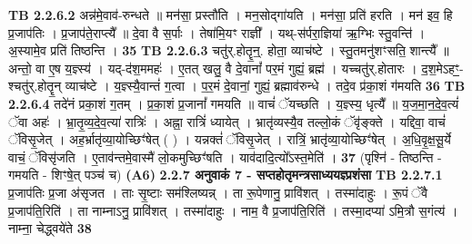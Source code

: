 \documentclass[17pt]{extarticle}
\begin{document}
                  \newline
                                \textbf{ TB 2.2.6.2} \newline
                  अन्न॑मे॒वाव॑-रुन्धते ॥ मन॑सा॒ प्रस्तौ॑ति । मन॒सोद्गा॑यति । मन॑सा॒ प्रति॑ हरति । मन॑ इव॒ हि प्र॒जाप॑तिः । प्र॒जाप॑ते॒राप्त्यै᳚ ॥ दे॒वा वै स॒र्पाः । तेषा॑मि॒यꣳ राज्ञी᳚ । यथ्-स॑र्परा॒ज्ञिया॑ ऋ॒ग्भिः स्तु॒वन्ति॑ । अ॒स्यामे॒व प्रति॑ तिष्ठन्ति । \textbf{ 35} \newline
                  \newline
                                \textbf{ TB 2.2.6.3} \newline
                  चतु॑र्.होतॄ॒न्॒. होता॒ व्याच॑ष्टे । स्तु॒तमनु॑शꣳसति॒ शान्त्यै᳚ ॥ अन्तो॒ वा ए॒ष य॒ज्ञ्स्य॑ । यद्-द॑श॒ममहः॑ । ए॒तत् खलु॒ वै दे॒वानां᳚ पर॒मं गुह्यं॒ ब्रह्म॑ । यच्चतु॑र्.होतारः । द॒श॒मेऽहꣳ॒॒-श्चतु॑र्.होतॄ॒न् व्याच॑ष्टे । य॒ज्ञ्स्यै॒वान्तं॑ ग॒त्वा । प॒र॒मं दे॒वानां॒ गुह्यं॒ ब्रह्माव॑रुन्धे । तदे॒व प्र॑का॒शं ग॑मयति \textbf{ 36} \newline
                  \newline
                                \textbf{ TB 2.2.6.4} \newline
                  तदे॑नं प्रका॒शं ग॒तम् । प्र॒का॒शं प्र॒जानां᳚ गमयति ॥ वाचं॑ ॅयच्छति । य॒ज्ञ्स्य॒ धृत्यै᳚ ॥ य॒ज॒मा॒न॒दे॒व॒त्यं॑ ॅवा अहः॑ । भ्रा॒तृ॒व्य॒दे॒व॒त्या॑ रात्रिः॑ । अह्ना॒ रात्रिं॑ ध्यायेत् । भ्रातृ॑व्यस्यै॒व तल्लो॒कं ॅवृ॑ङ्क्ते । यद्दिवा॒ वाचं॑ ॅविसृ॒जेत् । अह॒र्भ्रातृ॑व्या॒योच्छिꣳ॑षेत् ( ) । यन्नक्तं॑ ॅविसृ॒जेत् । रात्रिं॒ भ्रातृ॑व्या॒योच्छिꣳ॑षेत् । अ॒धि॒वृ॒क्ष॒सू॒र्ये वाचं॒ ॅविसृ॑जति । ए॒ताव॑न्तमे॒वास्मै॑ लो॒कमुच्छिꣳ॑षति । याव॑दादि॒त्यो᳚ऽस्त॒मेति॑ । \textbf{ 37} \newline
                  \newline
                                    (पृश्नि॑ - तिष्ठन्ति - गमयति - शिꣳषे॒त् पञ्च॑ च) \textbf{(A6)} \newline \newline
                \textbf{ 2.2.7     अनुवाकं   7 - सप्तहोतृमन्त्रसाध्ययज्ञ्प्रशंसा} \newline
                                \textbf{ TB 2.2.7.1} \newline
                  प्र॒जाप॑तिः प्र॒जा अ॑सृजत । ताः सृ॒ष्टाः सम॑श्लिष्यन्न् । ता रू॒पेणानु॒ प्रावि॑शत् । तस्मा॑दाहुः । रू॒पं ॅवै प्र॒जाप॑ति॒रिति॑ । ता नाम्नाऽनु॒ प्रावि॑शत् । तस्मा॑दाहुः । नाम॒ वै प्र॒जाप॑ति॒रिति॑ । तस्मा॒दप्या॑ ऽमि॒त्रौ स॒गंत्य॑ । नाम्ना॒ चेद्ध्वये॑ते \textbf{ 38} \newline
                  \newline
\end{document}
